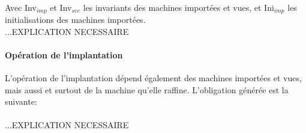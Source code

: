  \\

Avec Inv$_{imp}$ et  Inv$_{see}$ les invariants des machines importées et vues,
et Ini$_{imp}$ les initialisations des machines importées. \\
...EXPLICATION NECESSAIRE

\paragraph{Opération de l'implantation}
L'opération de l'implantation dépend également des machines importées et vues, mais
aussi et surtout de la machine qu'elle raffine. L'obligation générée est la
suivante:\\

\\

...EXPLICATION NECESSAIRE



